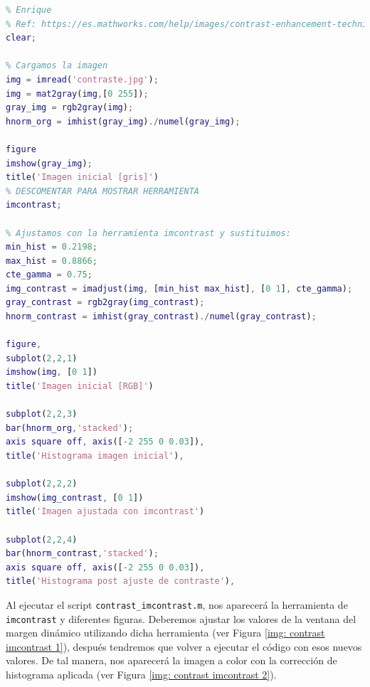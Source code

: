\documentclass[12pt]{article}
\begin{document}
	\begin{lstlisting}[language=Matlab, caption={Implementación contraste usando \texttt{imcontrast} en \texttt{MATLAB}}]
% 2 - Contraste 
% Enrique
% Ref: https://es.mathworks.com/help/images/contrast-enhancement-techniques.html
clear;

% Cargamos la imagen
img = imread('contraste.jpg');
img = mat2gray(img,[0 255]);
gray_img = rgb2gray(img);
hnorm_org = imhist(gray_img)./numel(gray_img);

figure
imshow(gray_img);
title('Imagen inicial [gris]')
% DESCOMENTAR PARA MOSTRAR HERRAMIENTA
imcontrast;

% Ajustamos con la herramienta imcontrast y sustituimos:
min_hist = 0.2198;
max_hist = 0.8866;
cte_gamma = 0.75;
img_contrast = imadjust(img, [min_hist max_hist], [0 1], cte_gamma);
gray_contrast = rgb2gray(img_contrast);
hnorm_contrast = imhist(gray_contrast)./numel(gray_contrast);

figure,
subplot(2,2,1)
imshow(img, [0 1])
title('Imagen inicial [RGB]')

subplot(2,2,3)
bar(hnorm_org,'stacked'); 
axis square off, axis([-2 255 0 0.03]), 
title('Histograma imagen inicial'), 

subplot(2,2,2)
imshow(img_contrast, [0 1])
title('Imagen ajustada con imcontrast')

subplot(2,2,4)
bar(hnorm_contrast,'stacked'); 
axis square off, axis([-2 255 0 0.03]), 
title('Histograma post ajuste de contraste'),
	\end{lstlisting}

	\pagebreak
	
	\noindent Al ejecutar el script \texttt{contrast\_imcontrast.m}, nos aparecerá la herramienta de \texttt{imcontrast} y diferentes figuras. Deberemos ajustar los valores de la ventana del margen dinámico utilizando dicha herramienta (ver Figura \ref{img: contrast imcontrast 1}), después tendremos que volver a ejecutar el código con esos nuevos valores. De tal manera, nos aparecerá la imagen a color con la corrección de histograma aplicada (ver Figura \ref{img: contrast imcontrast 2}).
	
	\vspace{10px}
	
\end{document}
